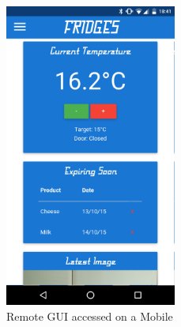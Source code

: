 \documentclass[10pt]{article}
\begin{document}
{{\begin{figure}[h]
\centering
\caption{Remote GUI accessed on a Mobile}
\label{Remote GUI accessed on a Mobile}
\includegraphics[height=10cm]{images/Mobile-Screenshot.png}
\end{figure}

}}
\end{document}
